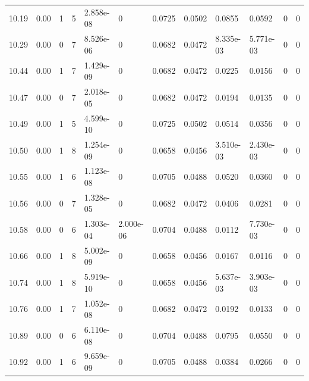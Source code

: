 \documentclass[preview]{standalone}
\begin{document}
{{{{{\begin{tabular}{L{1.2cm}C{1.2cm} C{0.3cm}C{0.5cm} C{1.4cm}C{1.4cm} C{1.4cm}C{1.4cm} C{1.6cm}C{1.6cm} C{1.6cm}C{1.6cm}}
  10.19  &  0.00  & 1     &  5 &  2.858e-08  & 0  &  0.0725&   0.0502& 0.0855 & 0.0592   &  0 & 0  \\ 
  10.29  &  0.00  & 0     &  7 &  8.526e-06  & 0  &  0.0682&   0.0472& 8.335e-03 & 5.771e-03   &  0 & 0  \\ 
  10.44  &  0.00  & 1     &  7 &  1.429e-09  & 0  &  0.0682&   0.0472& 0.0225 & 0.0156   &  0 & 0  \\ 
  10.47  &  0.00  & 0     &  7 &  2.018e-05  & 0  &  0.0682&   0.0472& 0.0194 & 0.0135   &  0 & 0  \\ 
  10.49  &  0.00  & 1     &  5 &  4.599e-10  & 0  &  0.0725&   0.0502& 0.0514 & 0.0356   &  0 & 0  \\ 
  10.50  &  0.00  & 1     &  8 &  1.254e-09  & 0  &  0.0658&   0.0456& 3.510e-03 & 2.430e-03   &  0 & 0  \\ 
  10.55  &  0.00  & 1     &  6 &  1.123e-08  & 0  &  0.0705&   0.0488& 0.0520 & 0.0360   &  0 & 0  \\ 
  10.56  &  0.00  & 0     &  7 &  1.328e-05  & 0  &  0.0682&   0.0472& 0.0406 & 0.0281   &  0 & 0  \\ 
  10.58  &  0.00  & 0     &  6 &  1.303e-04  & 2.000e-06  &  0.0704&   0.0488& 0.0112 & 7.730e-03   &  0 & 0  \\ 
  10.66  &  0.00  & 1     &  8 &  5.002e-09  & 0  &  0.0658&   0.0456& 0.0167 & 0.0116   &  0 & 0  \\ 
  10.74  &  0.00  & 1     &  8 &  5.919e-10  & 0  &  0.0658&   0.0456& 5.637e-03 & 3.903e-03   &  0 & 0  \\ 
  10.76  &  0.00  & 1     &  7 &  1.052e-08  & 0  &  0.0682&   0.0472& 0.0192 & 0.0133   &  0 & 0  \\ 
  10.89  &  0.00  & 0     &  6 &  6.110e-08  & 0  &  0.0704&   0.0488& 0.0795 & 0.0550   &  0 & 0  \\ 
  10.92  &  0.00  & 1     &  6 &  9.659e-09  & 0  &  0.0705&   0.0488& 0.0384 & 0.0266   &  0 & 0  \\ 
\hline 
\end{tabular} 

}}}}}
\end{document}
